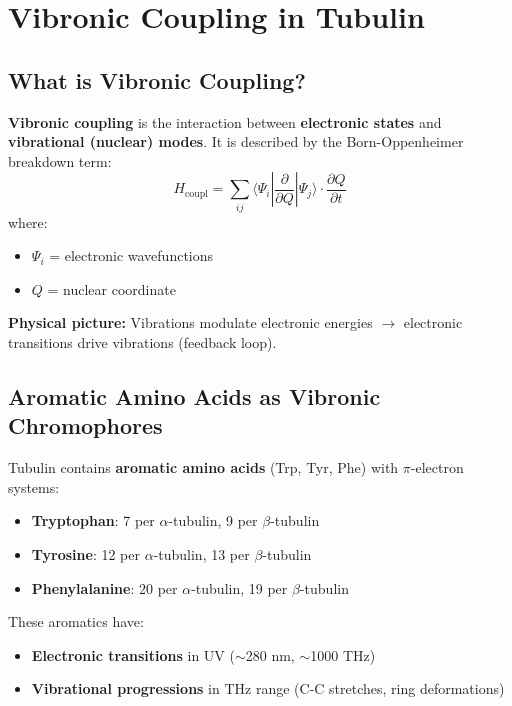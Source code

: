 \section{Vibronic Coupling in Tubulin}
\label{sec:vibronic-coupling}

\subsection{What is Vibronic Coupling?}
\label{subsec:vibronic-definition}

\textbf{Vibronic coupling} is the interaction between \textbf{electronic states} and \textbf{vibrational (nuclear) modes}. It is described by the Born-Oppenheimer breakdown term:
\begin{equation}
\label{eq:vibronic-coupling}
H_{\text{coupl}} = \sum_{ij} \langle \Psi_i | \frac{\partial}{\partial Q} | \Psi_j \rangle \cdot \frac{\partial Q}{\partial t}
\end{equation}
where:
\begin{itemize}
\item $\Psi_i$ = electronic wavefunctions
\item $Q$ = nuclear coordinate
\end{itemize}

\textbf{Physical picture:} Vibrations modulate electronic energies $\rightarrow$ electronic transitions drive vibrations (feedback loop).

\subsection{Aromatic Amino Acids as Vibronic Chromophores}\label{aromatic-amino-acids-as-vibronic-chromophores}

Tubulin contains \textbf{aromatic amino acids} (Trp, Tyr, Phe) with $\pi$-electron systems:
\begin{itemize}
\item \textbf{Tryptophan}: 7 per $\alpha$-tubulin, 9 per $\beta$-tubulin
\item \textbf{Tyrosine}: 12 per $\alpha$-tubulin, 13 per $\beta$-tubulin
\item \textbf{Phenylalanine}: 20 per $\alpha$-tubulin, 19 per $\beta$-tubulin
\end{itemize}

These aromatics have:
\begin{itemize}
\item \textbf{Electronic transitions} in UV ($\sim$280 nm, $\sim$1000 THz)
\item \textbf{Vibrational progressions} in THz range (C-C stretches, ring deformations)
\end{itemize}

